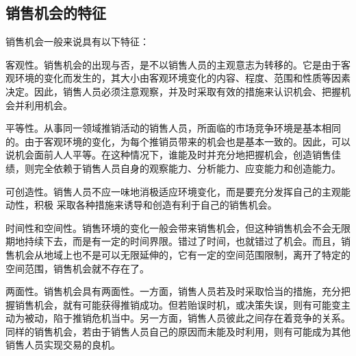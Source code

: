 \subsection {销售机会的特征}
    销售机会一般来说具有以下特征：

    \begin{enumerate.zh}

        \item 客观性。销售机会的出现与否，是不以销售人员的主观意志为转移的。它是由于客观环境的变化而发生的，其大小由客观环境变化的内容、程度、范围和性质等因素决定。因此，销售人员必须注意观察，并及时采取有效的措施来认识机会、把握机会并利用机会。

        \item 平等性。从事同一领域推销活动的销售人员，所面临的市场竞争环境是基本相同的。由于客观环境的变化，为每个推销员带来的机会也是基本一致的。因此，可以说机会面前人人平等。在这种情况下，谁能及时并充分地把握机会，创造销售佳绩，则完全依赖于销售人员自身的观察能力、分析能力、应变能力和创造能力。

        \item 可创造性。销售人员不应一味地消极适应环境变化，而是要充分发挥自己的主观能动性，积极 采取各种措施来诱导和创造有利于自己的销售机会。

        \item 时间性和空间性。销售环境的变化一般会带来销售机会，但这种销售机会不会无限期地持续下去，而是有一定的时间界限。错过了时间，也就错过了机会。而且，销售机会从地域上也不是可以无限延伸的，它有一定的空间范围限制，离开了特定的空间范围，销售机会就不存在了。

        \item 两面性。销售机会具有两面性。一方面，销售人员若及时采取恰当的措施，充分把握销售机会，就有可能获得推销成功。但若贻误时机，或决策失误，则有可能变主动为被动，陷于推销危机当中。另一方面，销售人员彼此之间存在着竞争的关系。同样的销售机会，若由于销售人员自己的原因而未能及时利用，则有可能成为其他销售人员实现交易的良机。

    \end{enumerate.zh}
